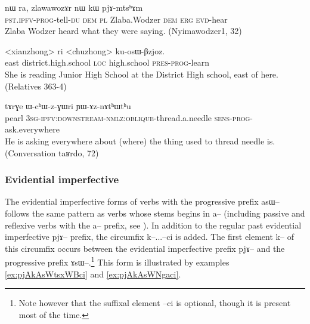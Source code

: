 \documentclass[oldfontcommands,oneside,a4paper,11pt]{article}
\newcommand{\ipa}[1]{{\phon \mbox{#1}}} %
\begin{document}
\begin{exe}
\ex \label{ex:pasWfCAtndZi}
\gll \ipa{pɯ-asɯ-fɕɤt-ndʑi} 	\ipa{nɯ} 	\ipa{ra,} 	\ipa{zlawawozɤr} 	\ipa{nɯ} 	\ipa{kɯ} 	\ipa{pjɤ-mtsʰɤm}\\
\textsc{pst.ipfv-prog}-tell-\textsc{du} \textsc{dem} \textsc{pl}  Zlaba.Wodzer \textsc{dem} \textsc{erg} \textsc{evd}-hear\\
\glt Zlaba Wodzer heard what they were saying. (Nyimawodzer1, 32)
\end{exe}

\begin{exe}
\ex \label{ex:kosWBzjoz}
\gll \ipa{akɯ} <xianzhong> \ipa{ri} <chuzhong> \ipa{ku-osɯ-βzjoz}. \\
east district.high.school \textsc{loc} high.school \textsc{pres-prog}-learn \\
\glt She is reading Junior High School at the District High school, east of here. (Relatives 363-4)
\end{exe}

 \begin{exe}
\ex \label{ex:YAznAthWthu}
\gll
\ipa{tɤrɣe}  	\ipa{ɯ-cʰɯ-z-ɣɯri}  	\ipa{ɲɯ-ɤz-nɤtʰɯtʰu}  	 \\
pearl \textsc{3sg-ipfv:downstream-nmlz:oblique}-thread.a.needle \textsc{sens-prog}-ask.everywhere \\
\glt He is asking everywhere about (where) the thing used to thread needle is. (Conversation \ipa{taʁrdo}, 72)
\end{exe}


\subsubsection{Evidential imperfective}

The evidential imperfective forms of verbs with the progressive prefix \ipa{asɯ--} follows the same pattern as verbs whose stems begins in \ipa{a--} (including passive and reflexive verbs with the \ipa{a--} prefix, see \citealt{jacques07passif}). In addition to the regular past evidential imperfective \ipa{pjɤ--} prefix, the circumfix \ipa{k--}...\ipa{--ci} is added. The first element \ipa{k--} of this circumfix occurs between the evidential imperfective prefix \ipa{pjɤ--} and the progressive prefix \ipa{ɤsɯ--}.\footnote{Note however that the suffixal element \ipa{--ci} is optional, though it is present most of the time.} This form is illustrated by examples \ref{ex:pjAkAsWtsxWBci} and \ref{ex:pjAkAsWNgaci}.
\end{document}
